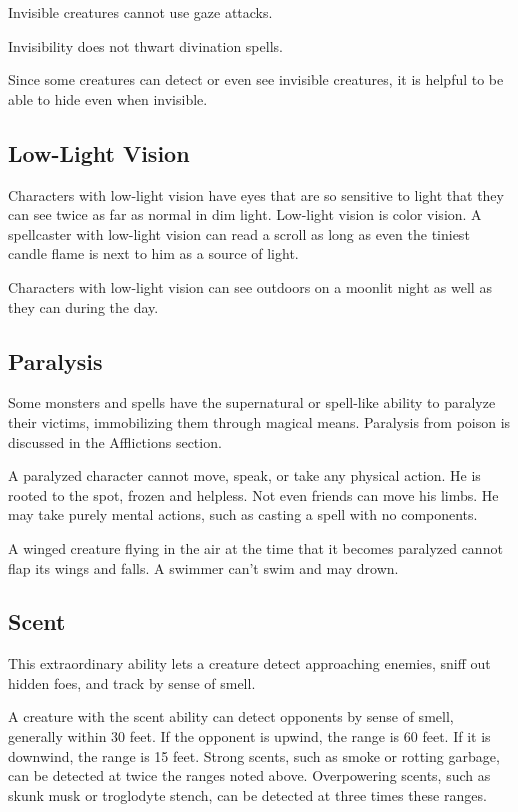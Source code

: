 Invisible creatures cannot use gaze attacks.
				
Invisibility does not thwart divination spells.
				
Since some creatures can detect or even see invisible creatures, it is helpful to be able to hide even when invisible.
				
\subsection{Low-Light Vision}

				
Characters with low-light vision have eyes that are so sensitive to light that they can see twice as far as normal in dim light. Low-light vision is color vision. A spellcaster with low-light vision can read a scroll as long as even the tiniest candle flame is next to him as a source of light.
				
Characters with low-light vision can see outdoors on a moonlit night as well as they can during the day.
				
\subsection{Paralysis}

				
Some monsters and spells have the supernatural or spell-like ability to paralyze their victims, immobilizing them through magical means. Paralysis from poison is discussed in the Afflictions section.
				
A paralyzed character cannot move, speak, or take any physical action. He is rooted to the spot, frozen and helpless. Not even friends can move his limbs. He may take purely mental actions, such as casting a spell with no components.
				
A winged creature flying in the air at the time that it becomes paralyzed cannot flap its wings and falls. A swimmer can't swim and may drown.
				
\subsection{Scent}

				
This extraordinary ability lets a creature detect approaching enemies, sniff out hidden foes, and track by sense of smell.
				
A creature with the scent ability can detect opponents by sense of smell, generally within 30 feet. If the opponent is upwind, the range is 60 feet. If it is downwind, the range is 15 feet. Strong scents, such as smoke or rotting garbage, can be detected at twice the ranges noted above. Overpowering scents, such as skunk musk or troglodyte stench, can be detected at three times these ranges.
				
